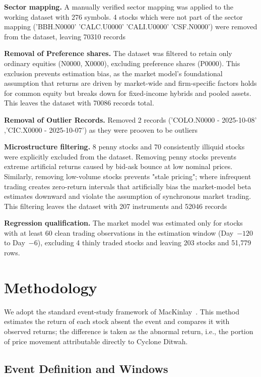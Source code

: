 \documentclass[sigconf, nonacm]{acmart}
\begin{document}
\textbf{Sector mapping.} 
A manually verified sector mapping was applied to
the working dataset with 276 symbols. 4 stocks which were not part of the sector mapping ('BBH.N0000' 'CALC.U0000' 'CALI.U0000' 'CSF.N0000') were removed from the dataset, leaving 70310 records

\textbf{Removal of Preference shares.} 
The dataset was filtered to retain only ordinary equities (N0000, X0000), excluding preference shares (P0000). This exclusion prevents estimation bias, as the market model's foundational assumption that returns are driven by market-wide and firm-specific factors holds for common equity but breaks down for fixed-income hybrids and pooled assets. This leaves the dataset with 70086 records total.

\textbf{Removal of Outlier Records.} 
Removed 2 records ('COLO.N0000 - 2025-10-08' ,'CIC.X0000 - 2025-10-07') as they were prooven to be outliers

\textbf{Microstructure filtering.} 
 8 penny stocks and 70 consistently illiquid stocks were explicitly excluded from the dataset. Removing penny stocks prevents extreme artificial returns caused by bid-ask bounce at low nominal prices. Similarly, removing low-volume stocks prevents "stale pricing"; where infrequent trading creates zero-return intervals that artificially bias the market-model beta estimates downward and violate the assumption of synchronous market trading. This filtering leaves the dataset with 207 instruments and 52046 records

\textbf{Regression qualification.} The market model was estimated only for
stocks with at least 60 clean trading observations in the estimation window
(Day~$-120$ to Day~$-6$), excluding 4 thinly traded stocks and leaving 203
stocks and 51,779 rows.

\section{Methodology}

We adopt the standard event-study framework of
MacKinlay~\cite{mackinlay1997}. This method estimates the return of each
stock absent the event and compares it with observed returns; the difference
is taken as the abnormal return, i.e., the portion of price movement
attributable directly to Cyclone Ditwah.

\subsection{Event Definition and Windows}
\end{document}
